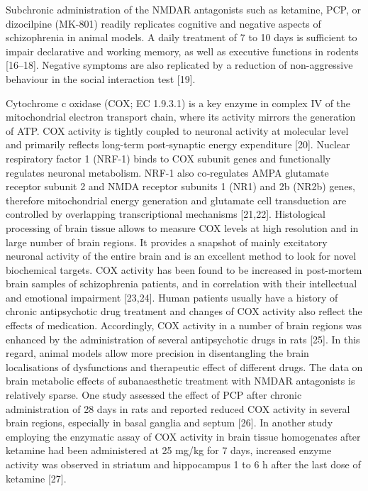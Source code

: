 \documentclass[man]{apa6}
\begin{document}
Subchronic administration of the NMDAR antagonists such as ketamine, PCP, or dizocilpine (MK-801) readily replicates cognitive and negative aspects of schizophrenia in animal models. A daily treatment of 7 to 10 days is sufficient to impair declarative and working memory, as well as executive functions in rodents {[}16--18{]}. Negative symptoms are also replicated by a reduction of non-aggressive behaviour in the social interaction test {[}19{]}.

Cytochrome c oxidase (COX; EC 1.9.3.1) is a key enzyme in complex IV of the mitochondrial electron transport chain, where its activity mirrors the generation of ATP. COX activity is tightly coupled to neuronal activity at molecular level and primarily reflects long-term post-synaptic energy expenditure {[}20{]}.
Nuclear respiratory factor 1 (NRF-1) binds to COX subunit genes and functionally regulates neuronal metabolism. NRF-1 also co‐regulates AMPA glutamate receptor subunit 2 and NMDA receptor subunits 1 (NR1) and 2b (NR2b) genes, therefore mitochondrial energy generation and glutamate cell transduction are controlled by overlapping transcriptional mechanisms {[}21,22{]}. Histological processing of brain tissue allows to measure COX levels at high resolution and in large number of brain regions. It provides a snapshot of mainly excitatory neuronal activity of the entire brain and is an excellent method to look for novel biochemical targets.
COX activity has been found to be increased in post-mortem brain samples of schizophrenia patients, and in correlation with their intellectual and emotional impairment {[}23,24{]}. Human patients usually have a history of chronic antipsychotic drug treatment and changes of COX activity also reflect the effects of medication. Accordingly, COX activity in a number of brain regions was enhanced by the administration of several antipsychotic drugs in rats {[}25{]}. In this regard, animal models allow more precision in disentangling the brain localisations of dysfunctions and therapeutic effect of different drugs. The data on brain metabolic effects of subanaesthetic treatment with NMDAR antagonists is relatively sparse. One study assessed the effect of PCP after chronic administration of 28 days in rats and reported reduced COX activity in several brain regions, especially in basal ganglia and septum {[}26{]}. In another study employing the enzymatic assay of COX activity in brain tissue homogenates after ketamine had been administered at 25 mg/kg for 7 days, increased enzyme activity was observed in striatum and hippocampus 1 to 6 h after the last dose of ketamine {[}27{]}.
\end{document}
